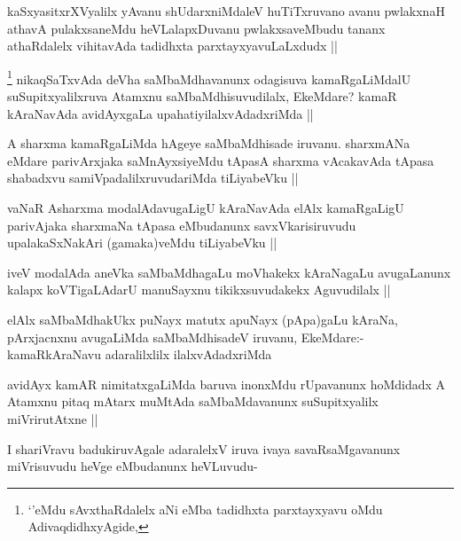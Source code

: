 
\begin{artha}
kaSxyasitxrXVyalilx yAvanu shUdarxniMdaleV huTiTxruvano avanu pwlakxnaH athavA pulakxsaneMdu heVLalapxDuvanu pwlakxsaveMbudu tananx athaRdalelx vihitavAda tadidhxta parxtayxyavuLaLxdudx ||
\end{artha}

\begin{artha}
\footnote{`\stext'eMdu sAvxthaRdalelx aNi eMba tadidhxta parxtayxyavu oMdu AdivaqdidhxyAgide,}
nikaqSaTxvAda deVha saMbaMdhavanunx odagisuva kamaRgaLiMdalU suSupitxyalilxruva Atamxnu saMbaMdhisuvudilalx, EkeMdare? kamaR kAraNavAda avidAyxgaLa upahatiyilalxvAdadxriMda || 
\end{artha}


\begin{artha}
A sharxma kamaRgaLiMda hAgeye saMbaMdhisade iruvanu. sharxmANa eMdare parivArxjaka saMnAyxsiyeMdu tApasA sharxma vAcakavAda tApasa shabadxvu samiVpadalilxruvudariMda tiLiyabeVku ||
\end{artha}

\begin{artha}
vaNaR Asharxma modalAdavugaLigU kAraNavAda elAlx kamaRgaLigU parivAjaka sharxmaNa tApasa eMbudanunx savxVkarisiruvudu upalakaSxNakAri (gamaka)veMdu tiLiyabeVku ||
\end{artha}

\begin{artha}
iveV modalAda aneVka saMbaMdhagaLu moVhakekx kAraNagaLu avugaLanunx kalapx koVTigaLAdarU manuSayxnu tikikxsuvudakekx Aguvudilalx ||
\end{artha}

\begin{artha}
elAlx saMbaMdhakUkx puNayx matutx apuNayx (pApa)gaLu kAraNa, pArxjacnxnu avugaLiMda saMbaMdhisadeV iruvanu, EkeMdare:- kamaRkAraNavu adaralilxlilx ilalxvAdadxriMda
\end{artha}

\begin{artha}
avidAyx kamAR nimitatxgaLiMda baruva inonxMdu rUpavanunx hoMdidadx A Atamxnu pitaq mAtarx muMtAda saMbaMdavanunx suSupitxyalilx miVrirutAtxne ||
\end{artha}


\begin{artha}
I shariVravu badukiruvAgale adaralelxV iruva ivaya savaRsaMgavanunx miVrisuvudu heVge eMbudanunx heVLuvudu-
\end{artha}

